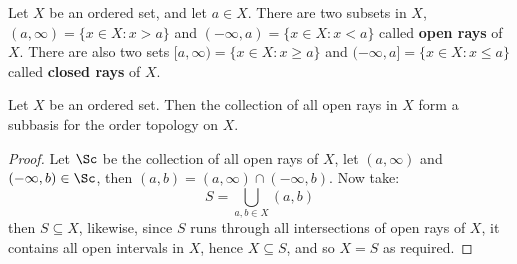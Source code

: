 \begin{definition}
    Let $X$ be an ordered set, and let  $a \in X$. There are two subsets in  $X$, 
    $(a,\infty)=\{x \in X: x>a\}$ and $(-\infty,a)=\{x \in X: x<a\}$ called \textbf{open rays} of $X$. 
    There are also two sets $[a,\infty)=\{x \in X: x \geq a\}$ and $(-\infty,a]=\{x \in X: x \leq a\}$ 
    called \textbf{closed rays} of $X$.
\end{definition}

\begin{theorem}\label{1.3.2}
    Let $X$ be an ordered set. Then the collection of all open rays in  $X$ form a subbasis 
    for the order topology on  $X$. 
\end{theorem}
\begin{proof}
    Let $\Sc$ be the collection of all open rays of  $X$, let  $(a,\infty)$ and  $(-\infty,b) \in \Sc$, 
    then  $(a,b)=(a,\infty) \cap (-\infty,b)$. Now take:
        \begin{equation*}
            S=\bigcup_{a,b \in X}{(a,b)}
        \end{equation*} 
    then $S \subseteq X$, likewise, since  $S$ runs through all intersections of open rays 
    of $X$, it contains all open intervals in  $X$, hence  $X \subseteq S$, and so  $X=S$ 
    as required.
\end{proof}
